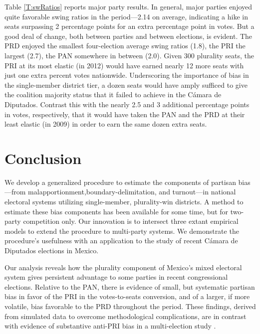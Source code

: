 \documentclass[letter,12pt]{article}
\begin{document}
Table \ref{T:swRatios} reports major party results. In general, major parties enjoyed quite favorable swing ratios in the period---2.14 on average, indicating a hike in seats surpassing 2 percentage points for an extra percentage point in votes. But a good deal of change, both between parties and between elections, is evident. The PRD enjoyed the smallest four-election average swing ratios (1.8), the PRI the largest (2.7), the PAN somewhere in between (2.0). Given 300 plurality seats, the PRI at its most elastic (in 2012) would have earned nearly 12 more seats with just one extra percent votes nationwide. Underscoring the importance of bias in the single-member district tier, a dozen seats would have amply sufficed to give the coalition majority status that it failed to achieve in the C\'amara de Diputados. Contrast this with the nearly 2.5 and 3 additional percentage points in votes, respectively, that it would have taken the PAN and the PRD at their least elastic (in 2009) in order to earn the same dozen extra seats. 


\section{Conclusion}

We develop a generalized procedure to estimate the components of partisan bias---from malapportionment,boundary-delimitation, and  turnout---in national electoral systems utilizing single-member, plurality-win districts. A method to estimate these bias components has been available for some time, but for two-party competition only. Our innovation is to intersect three extant empirical models to extend the procedure to multi-party systems. We demonstrate the procedure's usefulness with an application to the study of recent C\'amara de Diputados elections in Mexico. 

Our analysis reveals how the plurality component of Mexico's mixed electoral system gives persistent advantage to some parties in recent congressional elections. Relative to the PAN, there is evidence of small, but systematic partisan bias in favor of the PRI in the votes-to-seats conversion, and of a larger, if more volatile, bias favorable to the PRD throughout the period. These findings, derived from simulated data to overcome methodological complications, are in contrast with evidence of substantive anti-PRI bias in a multi-election study \citep{marquez2014biasBlog}. 
\end{document}
